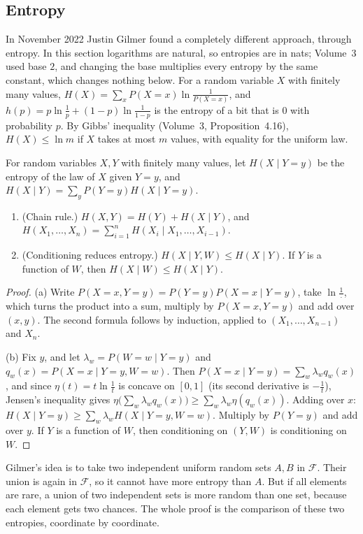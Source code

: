 \subsection{Entropy}

In November 2022 Justin Gilmer found a completely different approach, through entropy. In this section logarithms are natural, so entropies are in
nats; Volume~3 used base $2$, and changing the base multiplies every entropy by the same constant, which changes nothing below. For a random variable $X$
with finitely many values, $H(X)=\sum_xP(X=x)\ln\frac1{P(X=x)}$, and $h(p)=p\ln\frac1p+(1-p)\ln\frac1{1-p}$ is the entropy of a bit that is $0$ with
probability $p$. By Gibbs' inequality (Volume~3, Proposition~4.16), $H(X)\le\ln m$ if $X$ takes at most $m$ values, with equality for the uniform law.

For random variables $X,Y$ with finitely many values, let $H(X\mid Y=y)$ be the entropy of the law of $X$ given $Y=y$, and
$H(X\mid Y)=\sum_yP(Y=y)H(X\mid Y=y)$.

\begin{lemma}\label{conjectures:lem:condent}
\begin{enumerate}[label=(\alph*)]
\item (Chain rule.) $H(X,Y)=H(Y)+H(X\mid Y)$, and $H(X_1,\dots,X_n)=\sum_{i=1}^nH(X_i\mid X_1,\dots,X_{i-1})$.
\item (Conditioning reduces entropy.) $H(X\mid Y,W)\le H(X\mid Y)$. If $Y$ is a function of $W$, then $H(X\mid W)\le H(X\mid Y)$.
\end{enumerate}
\end{lemma}
\begin{proof}
(a) Write $P(X=x,Y=y)=P(Y=y)P(X=x\mid Y=y)$, take $\ln\frac1{\,\cdot\,}$, which turns the product into a sum, multiply by $P(X=x,Y=y)$ and add over
$(x,y)$. The second formula follows by induction, applied to $(X_1,\dots,X_{n-1})$ and $X_n$.

(b) Fix $y$, and let $\lambda_w=P(W=w\mid Y=y)$ and $q_w(x)=P(X=x\mid Y=y,W=w)$. Then $P(X=x\mid Y=y)=\sum_w\lambda_wq_w(x)$, and since
$\eta(t)=t\ln\frac1t$ is concave on $[0,1]$ (its second derivative is $-\frac1t$), Jensen's inequality gives
$\eta\bigl(\sum_w\lambda_wq_w(x)\bigr)\ge\sum_w\lambda_w\eta(q_w(x))$. Adding over $x$: $H(X\mid Y=y)\ge\sum_w\lambda_wH(X\mid Y=y,W=w)$. Multiply by
$P(Y=y)$ and add over $y$. If $Y$ is a function of $W$, then conditioning on $(Y,W)$ is conditioning on $W$.
\end{proof}

Gilmer's idea is to take two independent uniform random sets $A,B$ in $\mathcal F$. Their union is again in $\mathcal F$, so it cannot have more entropy
than $A$. But if all elements are rare, a union of two independent sets is more random than one set, because each element gets two chances. The whole
proof is the comparison of these two entropies, coordinate by coordinate.

